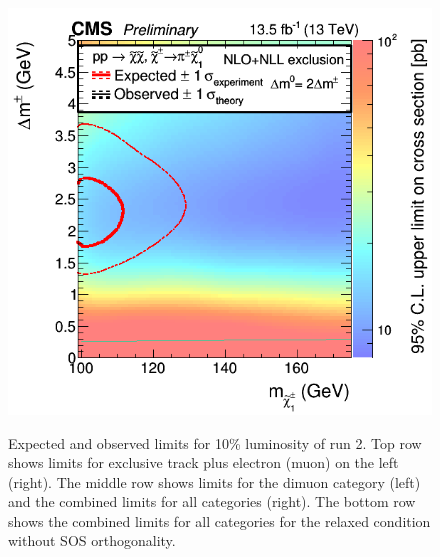 \begin{figure}[!htb]
\includegraphics[width=0.48\linewidth]{plots/limits/observed/PureHiggsino_SoftPromptRun2Inc_ObservedXSEC.png} \\

\caption[Expected and observed limits for 10\% luminosity of run 2]{Expected and observed limits for 10\% luminosity of run 2. Top row shows limits for exclusive track plus electron (muon) on the left (right). The middle row shows limits for the dimuon category (left) and the combined limits for all categories (right). The bottom row shows the combined limits for all categories for the relaxed condition without SOS orthogonality.}
\label{fig:observed_limits}
\end{figure}
